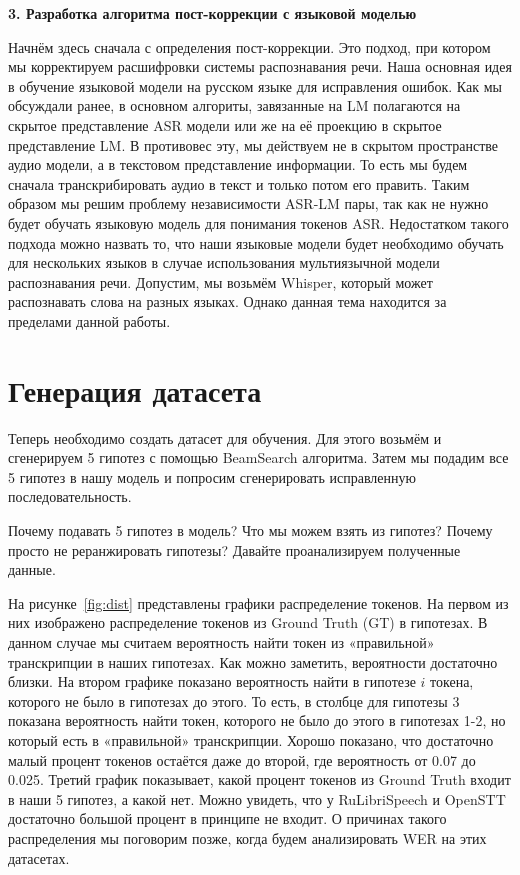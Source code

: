 \newpage
\begin{center}
  \textbf{\large 3. Разработка алгоритма пост-коррекции с языковой моделью}
\end{center}

Начнём здесь сначала с определения пост-коррекции.
Это подход, при котором мы корректируем расшифровки системы распознавания речи.
Наша основная идея в обучение языковой модели на русском языке для исправления ошибок.
Как мы обсуждали ранее, в основном алгориты, завязанные на LM полагаются на скрытое представление ASR модели или же на её проекцию в скрытое представление LM.
В противовес эту, мы действуем не в скрытом пространстве аудио модели, а в текстовом представление информации.
То есть мы будем сначала транскрибировать аудио в текст и только потом его править.
Таким образом мы решим проблему независимости ASR-LM пары, так как не нужно будет обучать языковую модель для понимания токенов ASR.
Недостатком такого подхода можно назвать то, что наши языковые модели будет необходимо обучать для нескольких языков в случае использования мультиязычной модели распознавания речи.
Допустим, мы возьмём Whisper, который может распознавать слова на разных языках.
Однако данная тема находится за пределами данной работы.

\section{Генерация датасета}
Теперь необходимо создать датасет для обучения.
Для этого возьмём и сгенерируем 5 гипотез с помощью BeamSearch алгоритма\cite{chen2023hyporadise}.
Затем мы подадим все 5 гипотез в нашу модель и попросим сгенерировать исправленную последовательность.

Почему подавать 5 гипотез в модель? Что мы можем взять из гипотез?
Почему просто не реранжировать гипотезы?
Давайте проанализируем полученные данные.

На рисунке~\ref{fig:dist} представлены графики распределение токенов.
На первом из них изображено распределение токенов из Ground Truth (GT) в гипотезах.
В данном случае мы считаем вероятность найти токен из «правильной» транскрипции в наших гипотезах.
Как можно заметить, вероятности достаточно близки.
На втором графике показано вероятность найти в гипотезе $i$ токена, которого не было в гипотезах до этого.
То есть, в столбце для гипотезы 3 показана вероятность найти токен, которого не было до этого в гипотезах 1-2, но который есть в «правильной» транскрипции.
Хорошо показано, что достаточно малый процент токенов остаётся даже до второй, где вероятность от 0.07 до 0.025.
Третий график показывает, какой процент токенов из Ground Truth входит в наши 5 гипотез, а какой нет.
Можно увидеть, что у RuLibriSpeech и OpenSTT достаточно большой процент в принципе не входит.
О причинах такого распределения мы поговорим позже, когда будем анализировать WER на этих датасетах.

